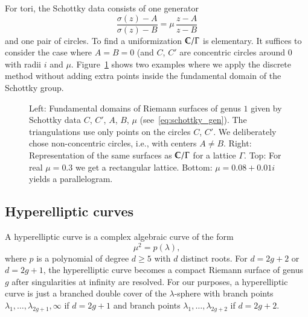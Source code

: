 \documentclass[Thesis]{subfiles}
\begin{document}
  For tori, the Schottky data
consists of one generator 
\begin{equation}
  \label{eq:schottky_gen}
  \frac{\sigma(z)-A}{\sigma(z)-B}=\mu\,\frac{z-A}{z-B}
\end{equation}
and one pair of circles. To find a uniformization $\mathbb C/\Gamma$ is
elementary. It suffices to consider the case where $A=B=0$ (and $C$,
$C'$ are concentric circles around $0$ with radii $i$ and
$\mu$. Figure~\ref{fig:schottky_g1} shows two examples where we apply
the discrete method without adding extra points inside the fundamental
domain of the Schottky group.
\begin{figure}
\centering
{}
\caption{ Left: Fundamental domains of Riemann surfaces of genus $1$
  given by Schottky data $C$, $C'$, $A$, $B$, $\mu$
  (see~\eqref{eq:schottky_gen}). The triangulations use only points on
  the circles $C$, $C'$. We deliberately chose non-concentric circles, i.e., 
  with centers $A\neq B$. Right: Representation of the same
  surfaces as $\mathbb C/\Gamma$ for a lattice $\Gamma$. Top: For real
  $\mu=0.3$ we get a rectangular lattice. Bottom: $\mu=0.08+0.01i$
  yields a parallelogram.}
\label{fig:schottky_g1}
\end{figure}

\subsection{Hyperelliptic curves}
\label{sec:hyperelliptic}

A hyperelliptic curve is a complex algebraic curve of the form 
\begin{equation}
  \label{eq:hyperelliptic_curve}
  \mu^2=p(\lambda), 
\end{equation}
where $p$ is a polynomial of degree $d\geq 5$ with $d$ distinct
roots. For $d=2g+2$ or $d=2g+1$, the hyperelliptic curve becomes a
compact Riemann surface of genus $g$ after singularities at infinity
are resolved. For our purposes, a hyperelliptic curve is just a
branched double cover of the $\lambda$-sphere with branch points
$\lambda_{1},\ldots,\lambda_{2g+1},\infty$ if $d=2g+1$ and branch
points $\lambda_{1},\ldots,\lambda_{2g+2}$ if $d=2g+2$.
\end{document}
